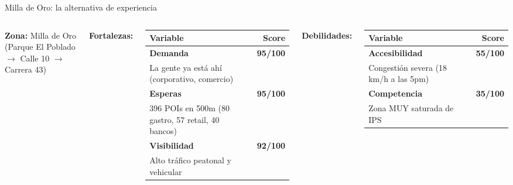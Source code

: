 \documentclass[aspectratio=169, 11pt]{beamer}
\begin{document}
\begin{frame}{Milla de Oro: la alternativa de experiencia}

\begin{columns}[T]
\vspace{2pt}
{\scriptsize\textbf{Zona:} Milla de Oro (Parque El Poblado $\rightarrow$ Calle 10 $\rightarrow$ Carrera 43)}

\vspace{4pt}
{\scriptsize\textbf{Fortalezas:}}
\vspace{2pt}

{\scriptsize
\begin{tabular}{@{}lr@{}}
\toprule
\textbf{Variable} & \textbf{Score} \\
\midrule
\rowcolor{dem!8}
\textcolor{dem}{\textbf{Demanda}} & \textcolor{dem}{\textbf{95/100}} \\
{\tiny La gente ya est\'{a} ah\'{i} (corporativo, comercio)} & \\[2pt]
\rowcolor{esp!8}
\textcolor{esp}{\textbf{Esperas}} & \textcolor{esp}{\textbf{95/100}} \\
{\tiny 396 POIs en 500m (80 gastro, 57 retail, 40 bancos)} & \\[2pt]
\rowcolor{vis!8}
\textcolor{vis}{\textbf{Visibilidad}} & \textcolor{vis}{\textbf{92/100}} \\
{\tiny Alto tr\'{a}fico peatonal y vehicular} & \\
\bottomrule
\end{tabular}
}

\vspace{2pt}
{\scriptsize\textbf{Debilidades:}}
\vspace{2pt}

{\scriptsize
\begin{tabular}{@{}lr@{}}
\toprule
\textbf{Variable} & \textbf{Score} \\
\midrule
\rowcolor{acc!8}
\textcolor{acc}{\textbf{Accesibilidad}} & \textcolor{comp}{\textbf{55/100}} \\
{\tiny Congesti\'{o}n severa (18 km/h a las 5pm)} & \\[2pt]
\rowcolor{comp!8}
\textcolor{comp}{\textbf{Competencia}} & \textcolor{comp}{\textbf{35/100}} \\
{\tiny Zona MUY saturada de IPS} & \\
\bottomrule
\end{tabular}
}


\end{columns}
\end{frame}
\end{document}
